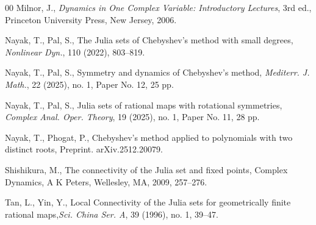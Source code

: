 \documentclass[12pt]{article}
\begin{document}
\begin{thebibliography}{00}
		Milnor, J., \textit{Dynamics in One Complex Variable: Introductory Lectures}, 3rd ed., Princeton University Press, New Jersey, 2006.
		
		Nayak, T., Pal, S., The Julia sets of Chebyshev's method with small degrees, \textit{Nonlinear Dyn.}, 110 (2022), 803--819.
		
		Nayak, T., Pal, S., Symmetry and dynamics of Chebyshev's method, \textit{Mediterr. J. Math.}, 22 (2025), no. 1, Paper No. 12, 25 pp.
		
		 Nayak, T., Pal, S., Julia sets of rational maps with rotational symmetries, \textit{Complex Anal. Oper. Theory}, 19 (2025), no. 1, Paper No. 11, 28 pp.
		
		 Nayak, T., Phogat, P., Chebyshev's method applied to polynomials with two distinct roots, Preprint. arXiv.2512.20079.
		
		 Shishikura, M., The connectivity of the Julia set and fixed points, Complex Dynamics, A K Peters, Wellesley, MA, 2009, 257--276.
		
		Tan, L., Yin, Y., Local Connectivity of the Julia sets for geometrically finite rational maps,\textit{Sci. China Ser. A}, 39 (1996), no. 1, 39--47.
	\end{thebibliography}
	
\end{document}
